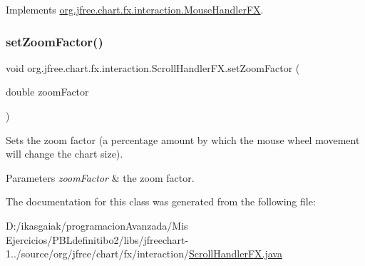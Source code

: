 Implements \mbox{\hyperlink{interfaceorg_1_1jfree_1_1chart_1_1fx_1_1interaction_1_1_mouse_handler_f_x_a271047b9229d2fbebbfefe173f153b2e}{org.\+jfree.\+chart.\+fx.\+interaction.\+Mouse\+Handler\+FX}}.

\mbox{\label{classorg_1_1jfree_1_1chart_1_1fx_1_1interaction_1_1_scroll_handler_f_x_a2a6635d72ddc78f3038ebf3570049edd}} 
\subsubsection{\texorpdfstring{set\+Zoom\+Factor()}{setZoomFactor()}}
{\footnotesize\ttfamily void org.\+jfree.\+chart.\+fx.\+interaction.\+Scroll\+Handler\+F\+X.\+set\+Zoom\+Factor (\begin{DoxyParamCaption}\item[{double}]{zoom\+Factor }\end{DoxyParamCaption})}

Sets the zoom factor (a percentage amount by which the mouse wheel movement will change the chart size).


\begin{DoxyParams}{Parameters}
{\em zoom\+Factor} & the zoom factor. \\
\hline
\end{DoxyParams}


The documentation for this class was generated from the following file\+:\begin{DoxyCompactItemize}
\item 
D\+:/ikasgaiak/programacion\+Avanzada/\+Mis Ejercicios/\+P\+B\+Ldefinitibo2/libs/jfreechart-\/1../source/org/jfree/chart/fx/interaction/\mbox{\hyperlink{_scroll_handler_f_x_8java}{Scroll\+Handler\+F\+X.\+java}}\end{DoxyCompactItemize}
